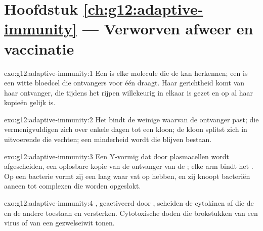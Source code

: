 \section*{Hoofdstuk \ref{ch:g12:adaptive-immunity} --- Verworven afweer en vaccinatie}

\begin{solution}{exo:g12:adaptive-immunity:1}
Een  is elke molecule die de  kan herkennen; een
 is een witte bloedcel die ontvangers voor één  draagt.
Haar gerichtheid komt van haar ontvanger, die tijdens het rijpen
willekeurig in elkaar is gezet en op al haar kopieën gelijk is.
\end{solution}

\begin{solution}{exo:g12:adaptive-immunity:2}
Het  bindt de weinige  waarvan de ontvanger past; die
 vermenigvuldigen zich over enkele dagen tot een kloon; de kloon
splitst zich in uitvoerende  die vechten; een minderheid wordt
 die blijven bestaan.
\end{solution}

\begin{solution}{exo:g12:adaptive-immunity:3}
Een Y-vormig  dat door plasmacellen wordt afgescheiden, een oplosbare
kopie van de ontvanger van de ; elke arm bindt het . Op een
bacterie vormt zij een laag waar  vat op hebben, en zij knoopt
bacteriën aaneen tot complexen die worden opgeslokt.
\end{solution}

\begin{solution}{exo:g12:adaptive-immunity:4}
, geactiveerd door , scheiden de
cytokinen af die de  en de andere  toestaan en versterken.
Cytotoxische  doden  die brokstukken van een virus of van
een gezwelseiwit tonen.
\end{solution}

